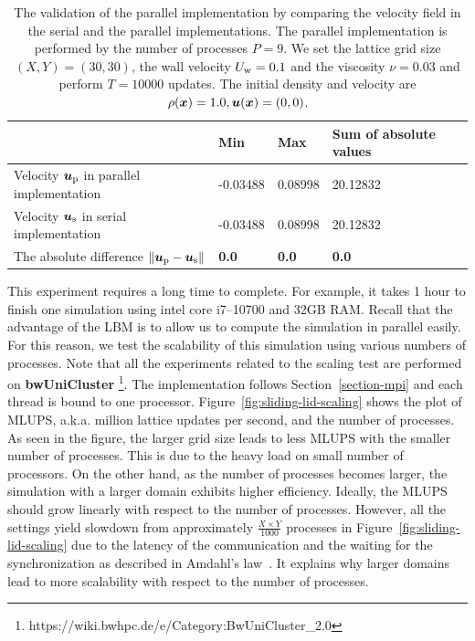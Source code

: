 \begin{table}
  \begin{center}
    \caption{The validation of the parallel implementation by comparing
    the velocity field in the serial and the parallel implementations.
    The parallel implementation is performed by the number of processes $P = 9$.
    We set the lattice grid size $(X, Y) = (30, 30)$,
    the wall velocity $U_{\rm w} = 0.1$ and the viscosity $\nu = 0.03$
    and perform $T = 10000$ updates.
    The initial density and velocity are $\rho(\boldsymbol{x}) = 1.0, \boldsymbol{u}(\boldsymbol{x}) = (0, 0)$.
    }
    \vspace{2mm}
    \label{tab:parallel-validation}
    \begin{tabular}{llll}
      \toprule
       & Min & Max & Sum of absolute values \\
      \midrule
      Velocity $\boldsymbol{u}_{\rm p}$ in parallel implementation & -0.03488 & 0.08998 & 20.12832 \\
      Velocity $\boldsymbol{u}_{\rm s}$ in serial implementation & -0.03488 & 0.08998 & 20.12832 \\
      The absolute difference $\| \boldsymbol{u}_{\rm p} - \boldsymbol{u}_{\rm s} \|$ & {\bf 0.0} & {\bf 0.0} & {\bf 0.0} \\
      \bottomrule
    \end{tabular}
  \end{center}
  \vspace{-5mm}
\end{table}

This experiment requires a long time to complete.
For example, it takes 1 hour to finish one simulation using
intel core i7--10700 and 32GB RAM.
Recall that the advantage of the LBM is to allow us to compute the simulation in
parallel easily.
For this reason, we test the scalability of this simulation using
various numbers of processes.
Note that all the experiments related to the scaling test
are performed on {\bf bwUniCluster}
\footnote{https://wiki.bwhpc.de/e/Category:BwUniCluster\_2.0}.
The implementation follows Section~\ref{section-mpi}
and each thread is bound to one processor.
Figure~\ref{fig:sliding-lid-scaling} shows the plot of
MLUPS, a.k.a. million lattice updates per second, and
the number of processes.
As seen in the figure, the larger grid size leads to
less MLUPS with the smaller number of processes.
This is due to the heavy load on small number of processors.
On the other hand, as the number of processes
becomes larger, the simulation with a larger domain exhibits
higher efficiency.
Ideally, the MLUPS should grow linearly with respect to the number of processes.
However, all the settings yield slowdown from approximately $\frac{X \times Y}{1000}$ processes
in Figure~\ref{fig:sliding-lid-scaling}
due to the latency of the communication
and the waiting for the synchronization as described in Amdahl's law~\cite{amdahl1967validity}.
It explains why larger domains lead to more scalability with respect to
the number of processes.

